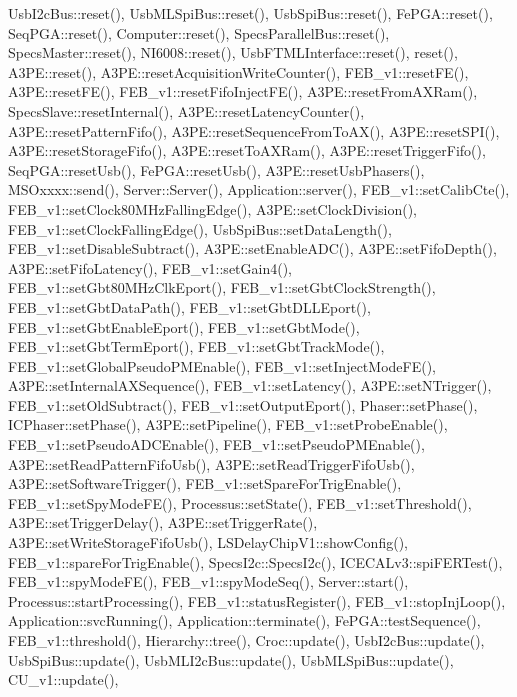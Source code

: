 Usb\+I2c\+Bus\+::reset(), Usb\+M\+L\+Spi\+Bus\+::reset(), Usb\+Spi\+Bus\+::reset(), Fe\+P\+G\+A\+::reset(), Seq\+P\+G\+A\+::reset(), Computer\+::reset(), Specs\+Parallel\+Bus\+::reset(), Specs\+Master\+::reset(), N\+I6008\+::reset(), Usb\+F\+T\+M\+L\+Interface\+::reset(), reset(), A3\+P\+E\+::reset(), A3\+P\+E\+::reset\+Acquisition\+Write\+Counter(), F\+E\+B\+\_\+v1\+::reset\+F\+E(), A3\+P\+E\+::reset\+F\+E(), F\+E\+B\+\_\+v1\+::reset\+Fifo\+Inject\+F\+E(), A3\+P\+E\+::reset\+From\+A\+X\+Ram(), Specs\+Slave\+::reset\+Internal(), A3\+P\+E\+::reset\+Latency\+Counter(), A3\+P\+E\+::reset\+Pattern\+Fifo(), A3\+P\+E\+::reset\+Sequence\+From\+To\+A\+X(), A3\+P\+E\+::reset\+S\+P\+I(), A3\+P\+E\+::reset\+Storage\+Fifo(), A3\+P\+E\+::reset\+To\+A\+X\+Ram(), A3\+P\+E\+::reset\+Trigger\+Fifo(), Seq\+P\+G\+A\+::reset\+Usb(), Fe\+P\+G\+A\+::reset\+Usb(), A3\+P\+E\+::reset\+Usb\+Phasers(), M\+S\+Oxxxx\+::send(), Server\+::\+Server(), Application\+::server(), F\+E\+B\+\_\+v1\+::set\+Calib\+Cte(), F\+E\+B\+\_\+v1\+::set\+Clock80\+M\+Hz\+Falling\+Edge(), A3\+P\+E\+::set\+Clock\+Division(), F\+E\+B\+\_\+v1\+::set\+Clock\+Falling\+Edge(), Usb\+Spi\+Bus\+::set\+Data\+Length(), F\+E\+B\+\_\+v1\+::set\+Disable\+Subtract(), A3\+P\+E\+::set\+Enable\+A\+D\+C(), A3\+P\+E\+::set\+Fifo\+Depth(), A3\+P\+E\+::set\+Fifo\+Latency(), F\+E\+B\+\_\+v1\+::set\+Gain4(), F\+E\+B\+\_\+v1\+::set\+Gbt80\+M\+Hz\+Clk\+Eport(), F\+E\+B\+\_\+v1\+::set\+Gbt\+Clock\+Strength(), F\+E\+B\+\_\+v1\+::set\+Gbt\+Data\+Path(), F\+E\+B\+\_\+v1\+::set\+Gbt\+D\+L\+L\+Eport(), F\+E\+B\+\_\+v1\+::set\+Gbt\+Enable\+Eport(), F\+E\+B\+\_\+v1\+::set\+Gbt\+Mode(), F\+E\+B\+\_\+v1\+::set\+Gbt\+Term\+Eport(), F\+E\+B\+\_\+v1\+::set\+Gbt\+Track\+Mode(), F\+E\+B\+\_\+v1\+::set\+Global\+Pseudo\+P\+M\+Enable(), F\+E\+B\+\_\+v1\+::set\+Inject\+Mode\+F\+E(), A3\+P\+E\+::set\+Internal\+A\+X\+Sequence(), F\+E\+B\+\_\+v1\+::set\+Latency(), A3\+P\+E\+::set\+N\+Trigger(), F\+E\+B\+\_\+v1\+::set\+Old\+Subtract(), F\+E\+B\+\_\+v1\+::set\+Output\+Eport(), Phaser\+::set\+Phase(), I\+C\+Phaser\+::set\+Phase(), A3\+P\+E\+::set\+Pipeline(), F\+E\+B\+\_\+v1\+::set\+Probe\+Enable(), F\+E\+B\+\_\+v1\+::set\+Pseudo\+A\+D\+C\+Enable(), F\+E\+B\+\_\+v1\+::set\+Pseudo\+P\+M\+Enable(), A3\+P\+E\+::set\+Read\+Pattern\+Fifo\+Usb(), A3\+P\+E\+::set\+Read\+Trigger\+Fifo\+Usb(), A3\+P\+E\+::set\+Software\+Trigger(), F\+E\+B\+\_\+v1\+::set\+Spare\+For\+Trig\+Enable(), F\+E\+B\+\_\+v1\+::set\+Spy\+Mode\+F\+E(), Processus\+::set\+State(), F\+E\+B\+\_\+v1\+::set\+Threshold(), A3\+P\+E\+::set\+Trigger\+Delay(), A3\+P\+E\+::set\+Trigger\+Rate(), A3\+P\+E\+::set\+Write\+Storage\+Fifo\+Usb(), L\+S\+Delay\+Chip\+V1\+::show\+Config(), F\+E\+B\+\_\+v1\+::spare\+For\+Trig\+Enable(), Specs\+I2c\+::\+Specs\+I2c(), I\+C\+E\+C\+A\+Lv3\+::spi\+F\+E\+R\+Test(), F\+E\+B\+\_\+v1\+::spy\+Mode\+F\+E(), F\+E\+B\+\_\+v1\+::spy\+Mode\+Seq(), Server\+::start(), Processus\+::start\+Processing(), F\+E\+B\+\_\+v1\+::status\+Register(), F\+E\+B\+\_\+v1\+::stop\+Inj\+Loop(), Application\+::svc\+Running(), Application\+::terminate(), Fe\+P\+G\+A\+::test\+Sequence(), F\+E\+B\+\_\+v1\+::threshold(), Hierarchy\+::tree(), Croc\+::update(), Usb\+I2c\+Bus\+::update(), Usb\+Spi\+Bus\+::update(), Usb\+M\+L\+I2c\+Bus\+::update(), Usb\+M\+L\+Spi\+Bus\+::update(), C\+U\+\_\+v1\+::update(), 